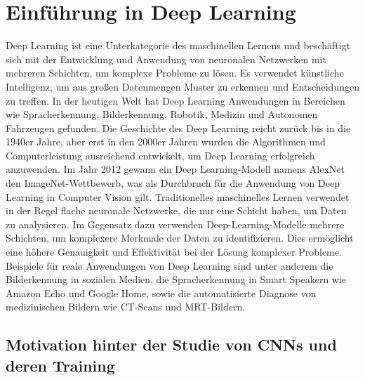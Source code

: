 \chapter{Einführung in Deep Learning}

Deep Learning ist eine Unterkategorie des maschinellen Lernens und beschäftigt sich mit der Entwicklung und Anwendung von neuronalen Netzwerken mit mehreren Schichten, um komplexe Probleme zu lösen. Es verwendet künstliche Intelligenz, um aus großen Datenmengen Muster zu erkennen und Entscheidungen zu treffen. In der heutigen Welt hat Deep Learning Anwendungen in Bereichen wie Spracherkennung, Bilderkennung, Robotik, Medizin und Autonomen Fahrzeugen gefunden. 
Die Geschichte des Deep Learning reicht zurück bis in die 1940er Jahre, aber erst in den 2000er Jahren wurden die Algorithmen und Computerleistung ausreichend entwickelt, um Deep Learning erfolgreich anzuwenden. Im Jahr 2012 gewann ein Deep Learning-Modell namens AlexNet den ImageNet-Wettbewerb, was als Durchbruch für die Anwendung von Deep Learning in Computer Vision gilt.
Traditionelles maschinelles Lernen verwendet in der Regel flache neuronale Netzwerke, die nur eine Schicht haben, um Daten zu analysieren. Im Gegensatz dazu verwenden Deep-Learning-Modelle mehrere Schichten, um komplexere Merkmale der Daten zu identifizieren. Dies ermöglicht eine höhere Genauigkeit und Effektivität bei der Lösung komplexer Probleme.
Beispiele für reale Anwendungen von Deep Learning sind unter anderem die Bilderkennung in sozialen Medien, die Spracherkennung in Smart Speakern wie Amazon Echo und Google Home, sowie die automatisierte Diagnose von medizinischen Bildern wie CT-Scans und MRT-Bildern.

\section{Motivation hinter der Studie von CNNs und deren Training}


